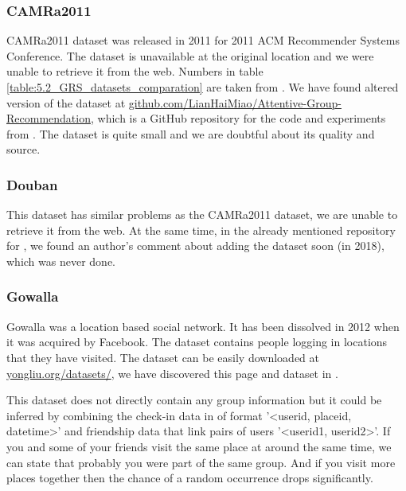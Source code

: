 \subsubsection{CAMRa2011} \label{subsubsec:04_group_datasets.overview.camra}
CAMRa2011 dataset was released in 2011 for 2011 ACM Recommender Systems Conference. The dataset is unavailable at the original location and we were unable to retrieve it from the web. Numbers in table \ref{table:5.2_GRS_datasets_comparation} are taken from \cite{attentative_group_recommendation}. We have found altered version of the dataset at \href{https://github.com/LianHaiMiao/Attentive-Group-Recommendation}{github.com/LianHaiMiao/Attentive-Group-Recommendation}, which is a GitHub repository for the code and experiments from \cite{attentative_group_recommendation}. The dataset is quite small and we are doubtful about its quality and source.


\subsubsection{Douban} \label{subsubsec:04_group_datasets.overview.douban}
This dataset has similar problems as the CAMRa2011 dataset, we are unable to retrieve it from the web. At the same time, in the already mentioned repository for \cite{attentative_group_recommendation}, we found an author's comment about adding the dataset soon (in 2018), which was never done.


\subsubsection{Gowalla} \label{subsubsec:04_group_datasets.overview.gowalla}
Gowalla was a location based social network. It has been dissolved in 2012 when it was acquired by Facebook. The dataset contains people logging in locations that they have visited. The dataset can be easily downloaded at \href{https://www.yongliu.org/datasets/}{yongliu.org/datasets/}, we have discovered this page and dataset in \cite{gowalla_weeplaces_yelp}.

This dataset does not directly contain any group information but it could be inferred by combining the check-in data in of format '\textless userid, placeid, datetime\textgreater' and friendship data that link pairs of users '\textless userid1, userid2\textgreater'. If you and some of your friends visit the same place at around the same time, we can state that probably you were part of the same group. And if you visit more places together then the chance of a random occurrence drops significantly.

